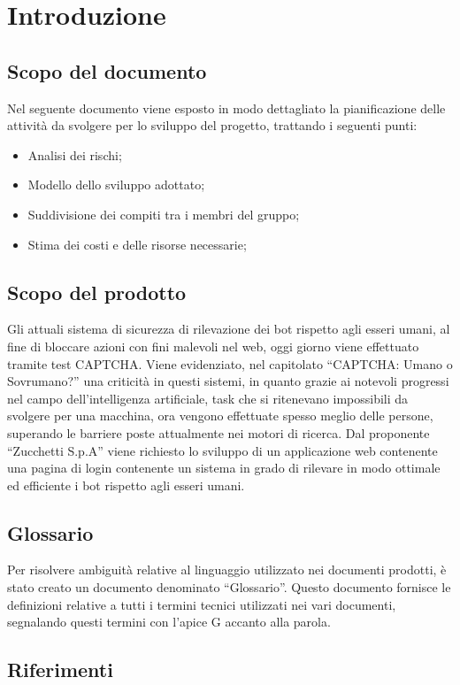 \section{Introduzione}

\subsection{Scopo del documento}
Nel seguente documento viene esposto in modo dettagliato la pianificazione delle attività da svolgere  per lo sviluppo del progetto, trattando i seguenti punti:
\begin{itemize}
	\item Analisi dei rischi;
	\item Modello dello sviluppo adottato;
	\item Suddivisione dei compiti tra i membri del gruppo;
	\item Stima dei costi e delle risorse necessarie;
\end{itemize}

\subsection{Scopo del prodotto}
Gli attuali sistema di sicurezza di rilevazione dei bot rispetto agli esseri umani, al fine di bloccare azioni con fini malevoli nel web, oggi giorno viene effettuato tramite test CAPTCHA. Viene evidenziato, nel capitolato “CAPTCHA: Umano o Sovrumano?” una criticità in questi sistemi, in quanto grazie ai notevoli progressi nel campo dell’intelligenza artificiale, task che si ritenevano impossibili da svolgere per una macchina, ora vengono effettuate spesso meglio delle persone, superando le barriere poste attualmente nei motori di ricerca.
Dal proponente “Zucchetti S.p.A” viene richiesto lo sviluppo di un applicazione web contenente una pagina di login contenente un sistema in grado di rilevare in modo ottimale ed efficiente i bot rispetto agli esseri umani.

\subsection{Glossario}
Per risolvere ambiguità relative al linguaggio utilizzato nei documenti prodotti, è stato creato un documento denominato “Glossario”. Questo documento fornisce le definizioni relative a tutti i termini tecnici utilizzati nei vari documenti, segnalando questi termini con l’apice G accanto alla parola.

\subsection{Riferimenti}

